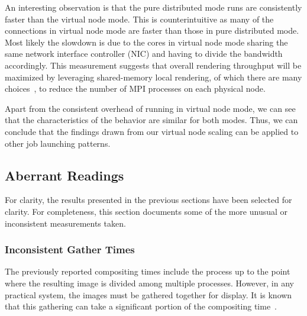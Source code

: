 \documentclass{vgtc}                          %
\newcommand*{\lcite}[1]{~\cite{#1}}
\begin{document}
An interesting observation is that the pure distributed mode runs are consistently faster than the virtual node mode.
This is counterintuitive as many of the connections in virtual node mode are faster than those in pure distributed mode.
Most likely the slowdown is due to the cores in virtual node mode sharing the same network interface controller (NIC) and having to divide the bandwidth accordingly.
This measurement suggests that overall rendering throughput will be maximized by leveraging shared-memory local rendering, of which there are many choices\lcite{OpenSWR,Wald2014,Knoll2014,Larsen2015:RayTrace,Moreland2016:VTKm}, to reduce the number of MPI processes on each physical node.

Apart from the consistent overhead of running in virtual node mode, we can see that the characteristics of the behavior are similar for both modes.
Thus, we can conclude that the findings drawn from our virtual node scaling can be applied to other job launching patterns.

\subsection{Aberrant Readings}

For clarity, the results presented in the previous sections have been selected for clarity.
For completeness, this section documents some of the more unusual or inconsistent measurements taken.

\subsubsection{Inconsistent Gather Times}
\label{sec:Gather}

The previously reported compositing times include the process up to the point where the resulting image is divided among multiple processes.
However, in any practical system, the images must be gathered together for display.
It is known that this gathering can take a significant portion of the compositing time\lcite{Rabenseifner2004,Moreland2011:SC,Larsen2016,Nonaka2018}.
\end{document}

